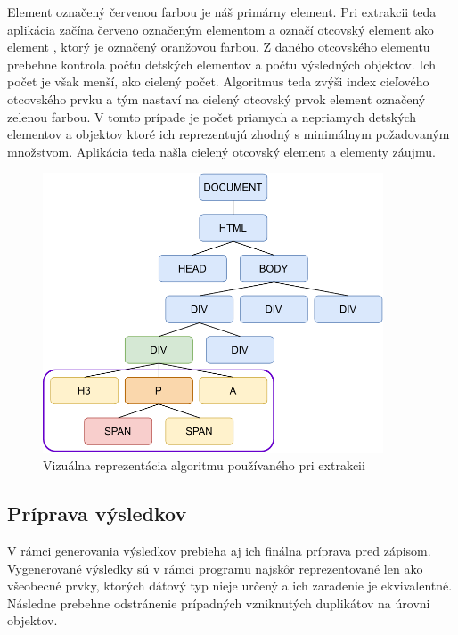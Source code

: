 Element  označený červenou farbou je náš primárny element. Pri extrakcii teda aplikácia začína červeno označeným elementom  a označí otcovský element ako element , ktorý je označený oranžovou farbou. Z daného otcovského elementu prebehne kontrola počtu detských elementov a počtu výsledných objektov. Ich počet je však menší, ako cielený počet. Algoritmus teda zvýši index cieľového otcovského prvku a tým nastaví na cielený otcovský prvok element  označený zelenou farbou. V tomto prípade je počet priamych a nepriamych detských elementov a objektov ktoré ich reprezentujú zhodný s minimálnym požadovaným množstvom. Aplikácia teda našla cielený otcovský element a elementy záujmu.

\bigskip

 \begin{figure}[hbt]
	\centering
	\includegraphics[width=0.9\textwidth]{obrazky-figures/dom.pdf}
	\caption{Vizuálna reprezentácia algoritmu používaného pri extrakcii}
	\label{domvisual}
\end{figure}

\newpage

\subsection{Príprava výsledkov}

V rámci generovania výsledkov prebieha aj ich finálna príprava pred zápisom. Vygenerované výsledky sú v rámci programu najskôr reprezentované len ako všeobecné prvky, ktorých dátový typ nieje určený a ich zaradenie je ekvivalentné. Následne prebehne odstránenie prípadných vzniknutých duplikátov na úrovni objektov. 

